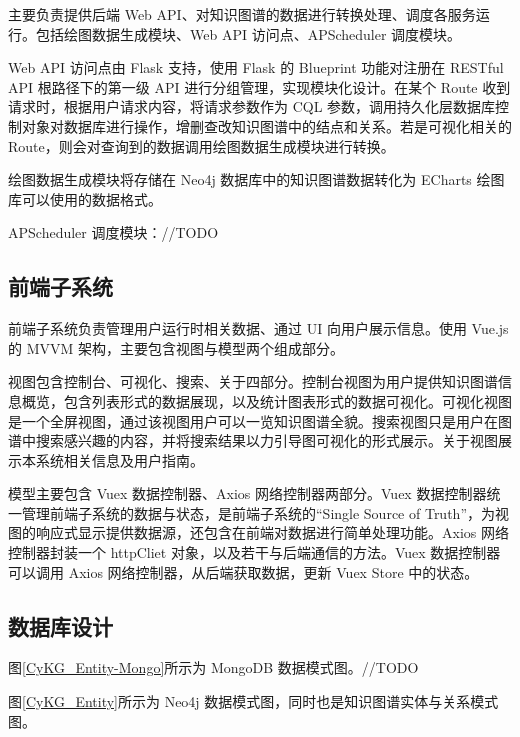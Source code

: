 \documentclass[a4paper,AutoFakeBold,oneside,12pt]{book}
\begin{document}
主要负责提供后端 Web API、对知识图谱的数据进行转换处理、调度各服务运行。包括绘图数据生成模块、Web API 访问点、APScheduler 调度模块。

Web API 访问点由 Flask 支持，使用 Flask 的 Blueprint 功能对注册在 RESTful API 根路径下的第一级 API 进行分组管理，实现模块化设计。在某个 Route 收到请求时，根据用户请求内容，将请求参数作为 CQL 参数，调用持久化层数据库控制对象对数据库进行操作，增删查改知识图谱中的结点和关系。若是可视化相关的 Route，则会对查询到的数据调用绘图数据生成模块进行转换。

绘图数据生成模块将存储在 Neo4j 数据库中的知识图谱数据转化为 ECharts 绘图库可以使用的数据格式。

APScheduler 调度模块：//TODO

\subsection{前端子系统}

前端子系统负责管理用户运行时相关数据、通过 UI 向用户展示信息。使用 Vue.js 的 MVVM 架构，主要包含视图与模型两个组成部分。

视图包含控制台、可视化、搜索、关于四部分。控制台视图为用户提供知识图谱信息概览，包含列表形式的数据展现，以及统计图表形式的数据可视化。可视化视图是一个全屏视图，通过该视图用户可以一览知识图谱全貌。搜索视图只是用户在图谱中搜索感兴趣的内容，并将搜索结果以力引导图可视化的形式展示。关于视图展示本系统相关信息及用户指南。

模型主要包含 Vuex 数据控制器、Axios 网络控制器两部分。Vuex 数据控制器统一管理前端子系统的数据与状态，是前端子系统的“Single Source of Truth”，为视图的响应式显示提供数据源，还包含在前端对数据进行简单处理功能。Axios 网络控制器封装一个 httpCliet 对象，以及若干与后端通信的方法。Vuex 数据控制器可以调用 Axios 网络控制器，从后端获取数据，更新 Vuex Store 中的状态。

\subsection{数据库设计}

图\ref{CyKG_Entity-Mongo}所示为 MongoDB 数据模式图。//TODO


图\ref{CyKG_Entity}所示为 Neo4j 数据模式图，同时也是知识图谱实体与关系模式图。

\end{document}
